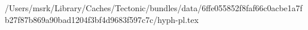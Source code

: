 /Users/msrk/Library/Caches/Tectonic/bundles/data/6ffe055852f8faf66c0acbe1a7fb27f87b869a90bad1204f3bf4d9683f597c7c/hyph-pl.tex
